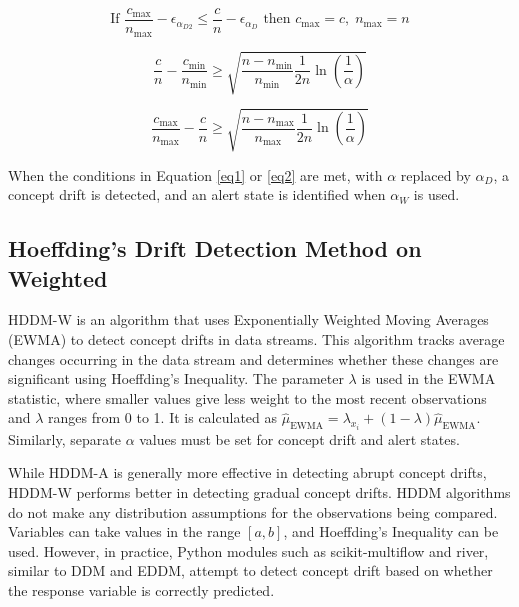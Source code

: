 \documentclass[pdflatex,sn-mathphys-ay]{sn-jnl}%
\theoremstyle{thmstyleone}%
\theoremstyle{thmstyletwo}%
\theoremstyle{thmstylethree}%
\begin{document}
\begin{equation}
\label{eq2}
\text{If } \frac{c_{\text{max}}}{n_{\text{max}}} - \epsilon_{\alpha_{D2}} \leq \frac{c}{n} - \epsilon_{\alpha_D} \text{ then } c_{\text{max}} = c, \; n_{\text{max}} = n
\end{equation}

\begin{equation}
\frac{c}{n} - \frac{c_{\text{min}}}{n_{\text{min}}} \geq \sqrt{\frac{n - n_{\text{min}}}{n_{\text{min}}} \frac{1}{2n} \ln \left(\frac{1}{\alpha}\right)}
\end{equation}

\begin{equation}
\frac{c_{\text{max}}}{n_{\text{max}}} - \frac{c}{n} \geq \sqrt{\frac{n - n_{\text{max}}}{n_{\text{max}}} \frac{1}{2n} \ln \left(\frac{1}{\alpha}\right)}
\end{equation}

\noindent When the conditions in Equation \ref{eq1} or \ref{eq2} are met, with $\alpha$ replaced by $\alpha_D$, a concept drift is detected, and an alert state is identified when $\alpha_W$ is used.

\subsection{Hoeffding’s Drift Detection Method on Weighted}

HDDM-W is an algorithm that uses Exponentially Weighted Moving Averages (EWMA) to detect concept drifts in data streams. This algorithm tracks average changes occurring in the data stream and determines whether these changes are significant using Hoeffding's Inequality. The parameter \(\lambda\) is used in the EWMA statistic, where smaller values give less weight to the most recent observations and \(\lambda\) ranges from 0 to 1. It is calculated as \(\hat{\mu}_{\text{EWMA}} = \lambda_{x_i} + (1 - \lambda) \hat{\mu}_{\text{EWMA}}\). Similarly, separate \(\alpha\) values must be set for concept drift and alert states.

While HDDM-A is generally more effective in detecting abrupt concept drifts, HDDM-W performs better in detecting gradual concept drifts. HDDM algorithms do not make any distribution assumptions for the observations being compared. Variables can take values in the range \([a, b]\), and Hoeffding's Inequality can be used. However, in practice, Python modules such as scikit-multiflow and river, similar to DDM and EDDM, attempt to detect concept drift based on whether the response variable is correctly predicted.
\end{document}
